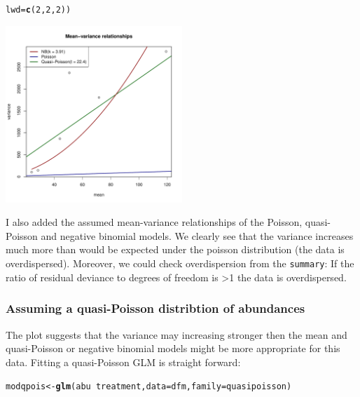 \documentclass{scrartcl}\usepackage[]{graphicx}\usepackage[]{color}
\makeatletter
\newcommand{\hlnum}[1]{\textcolor[rgb]{0.686,0.059,0.569}{#1}}%
\newcommand{\hlopt}[1]{\textcolor[rgb]{0,0,0}{#1}}%
\newcommand{\hlstd}[1]{\textcolor[rgb]{0.345,0.345,0.345}{#1}}%
\newcommand{\hlkwb}[1]{\textcolor[rgb]{0.69,0.353,0.396}{#1}}%
\newcommand{\hlkwc}[1]{\textcolor[rgb]{0.333,0.667,0.333}{#1}}%
\newcommand{\hlkwd}[1]{\textcolor[rgb]{0.737,0.353,0.396}{\textbf{#1}}}%
\newenvironment{kframe}{%
 \def\at@end@of@kframe{}%
 \ifinner\ifhmode%
  \def\at@end@of@kframe{\end{minipage}}%
  \begin{minipage}{\columnwidth}%
 \fi\fi%
 \def\FrameCommand##1{\hskip\@totalleftmargin \hskip-\fboxsep
 \colorbox{shadecolor}{##1}\hskip-\fboxsep
     \hskip-\linewidth \hskip-\@totalleftmargin \hskip\columnwidth}%
 \MakeFramed {\advance\hsize-\width
   \@totalleftmargin\z@ \linewidth\hsize
   \@setminipage}}%
 {\par\unskip\endMakeFramed%
 \at@end@of@kframe}
\newenvironment{knitrout}{}{} %
\makeatother
\begin{document}
\begin{knitrout}
\begin{kframe}
\begin{alltt}
       \hlkwc{lwd} \hlstd{=} \hlkwd{c}\hlstd{(}\hlnum{2}\hlstd{,}\hlnum{2}\hlstd{,} \hlnum{2}\hlstd{))}
\end{alltt}
\end{kframe}
\includegraphics[width=0.5\textwidth]{figure/mod_count_meanvar-1} 

\end{knitrout}

I also added the assumed mean-variance relationships of the Poisson, quasi-Poisson and negative binomial models.
We clearly see that the variance increases much more than would be expected under the poisson distribution (the data is overdispersed).
Moreover, we could check overdispersion from the \texttt{summary}:
If the ratio of residual deviance to degrees of freedom is \textgreater 1 the data is overdispersed.


\subsubsection{Assuming a quasi-Poisson distribtion of abundances}
The plot suggests that the variance may increasing stronger then the mean and quasi-Poisson or negative binomial models might be more appropriate for this data.
Fitting a quasi-Poisson GLM is straight forward:
\begin{knitrout}
\color{fgcolor}\begin{kframe}
\begin{alltt}
\hlstd{modqpois} \hlkwb{<-} \hlkwd{glm}\hlstd{(abu} \hlopt{~} \hlstd{treatment,} \hlkwc{data} \hlstd{= dfm,} \hlkwc{family} \hlstd{= quasipoisson)}
\end{alltt}
\end{kframe}
\end{knitrout}
\end{document}
